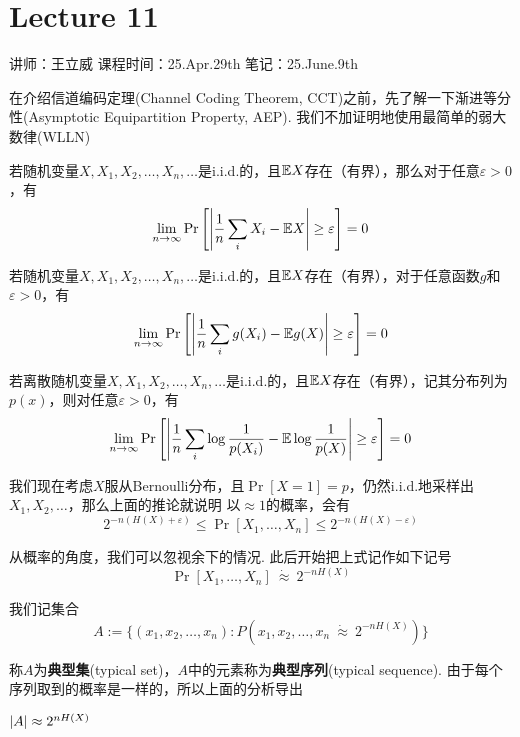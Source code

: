 \chapter{Lecture 11}

\begin{center}
    讲师：王立威 \qquad
    课程时间：25.Apr.29th \qquad 
    笔记：25.June.9th
\end{center}

\bigskip

在介绍信道编码定理(Channel Coding Theorem, CCT)之前，先了解一下渐进等分性(Asymptotic Equipartition Property, AEP). 我们不加证明地使用最简单的弱大数律(WLLN) 
\begin{theorem}
    若随机变量$X,X_1,X_2,\dots,X_n,\dots$是i.i.d.的，且$\mathbb{E} X$存在（有界），那么对于任意$\varepsilon > 0$，有 
    \[
    \lim_{n\rightarrow \infty}\Pr\left[
        \left\vert
            \dfrac 1n \sum_{i} X_i - \mathbb{E} X
        \right\vert \ge \varepsilon
    \right] = 0
    \]
\end{theorem}
\begin{corollary}
    若随机变量$X,X_1,X_2,\dots,X_n,\dots$是i.i.d.的，且$\mathbb{E} X$存在（有界），对于任意函数$g$和$\varepsilon > 0$，有 
    \[
    \lim_{n\rightarrow \infty}\Pr\left[
        \left\vert
            \dfrac 1n \sum_{i} g(X_i) - \mathbb{E} g(X)
        \right\vert \ge \varepsilon
    \right] = 0
    \]
\end{corollary}
\begin{corollary}
    若离散随机变量$X,X_1,X_2,\dots,X_n,\dots$是i.i.d.的，且$\mathbb{E} X$存在（有界），记其分布列为$p(x)$，则对任意$\varepsilon > 0$，有 
    \[
    \lim_{n\rightarrow \infty}\Pr\left[
        \left\vert
            \dfrac 1n \sum_{i} \log\dfrac{1}{p(X_i)} - \mathbb{E} \log \dfrac{1}{p(X)}
        \right\vert \ge \varepsilon
    \right] = 0
    \]
\end{corollary}

我们现在考虑$X$服从Bernoulli分布，且$\Pr[X=1]=p$，仍然i.i.d.地采样出$X_1,X_2,\dots$，那么上面的推论就说明
以$\approx 1$的概率，会有 
\[
2^{-n(H(X) + \varepsilon)} \le \Pr[X_1, \dots, X_n] \le 2^{-n(H(X) - \varepsilon)}
\] 

从概率的角度，我们可以忽视余下的情况. 此后开始把上式记作如下记号
\[
\Pr[X_1, \dots, X_n] \ \dot{\approx} \ 2^{-n H(X)}
\]

我们记集合 
\[
A:= \{(x_1, x_2, \dots, x_n) : P(x_1,x_2,\dots, x_n \ \dot{\approx} \ 2^{-nH(X)})\}
\]

称$A$为\textbf{典型集}(typical set)，$A$中的元素称为\textbf{典型序列}(typical sequence). 由于每个序列取到的概率是一样的，所以上面的分析导出
\begin{theorem}[AEP]
    $\left\vert A\right\vert \approx 2^{nH(X)}$
\end{theorem}

